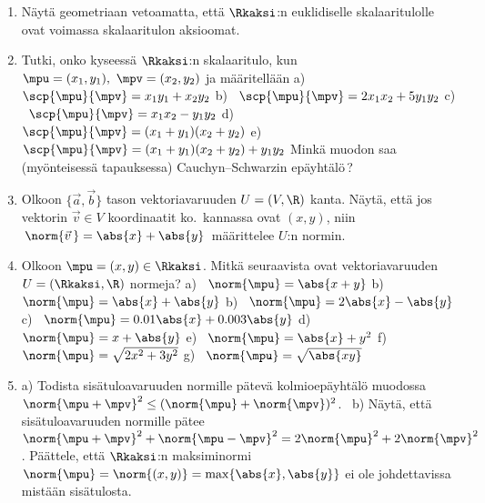 \Harj
\begin{enumerate}

\item
Näytä geometriaan vetoamatta, että $\Rkaksi$:n euklidiselle skalaaritulolle ovat voimassa
skalaaritulon aksioomat.

\item
Tutki, onko kyseessä $\Rkaksi$:n skalaaritulo, kun $\mpu=(x_1,y_1),\ \mpv = (x_2, y_2)$ ja
määritellään \newline
a) \ $\scp{\mpu}{\mpv}=x_1 y_1 + x_2 y_2$ \newline
b) \ $\scp{\mpu}{\mpv}=2x_1 x_2 + 5y_1 y_2$ \newline
c) \ $\scp{\mpu}{\mpv}=x_1 x_2 - y_1 y_2$ \newline
d) \ $\scp{\mpu}{\mpv}=(x_1+y_1)(x_2+y_2)$ \newline
e) \ $\scp{\mpu}{\mpv}=(x_1+y_1)(x_2+y_2)+y_1 y_2$ \newline
Minkä muodon saa (myönteisessä tapauksessa) Cauchyn--Schwarzin epäyhtälö\,?

\item
Olkoon $\{\vec a,\vec b\}$ tason vektoriavaruuden $U=(V,\R)$ kanta. Näytä, että jos vektorin
$\vec v \in V$ koordinaatit ko.\ kannassa ovat $(x,y)$, niin 
$\,\norm{\vec v\,} = \abs{x}+\abs{y}\,$ määrittelee $U$:n normin.

\item
Olkoon $\mpu=(x,y)\in\Rkaksi$. Mitkä seuraavista ovat vektoriavaruuden $U=(\Rkaksi,\R)$
normeja? \newline
a) \ $\norm{\mpu}=\abs{x+y}$ \newline
b) \ $\norm{\mpu}=\abs{x}+\abs{y}$ \newline
b) \ $\norm{\mpu}=2\abs{x}-\abs{y}$ \newline
c) \ $\norm{\mpu}=0.01\abs{x}+0.003\abs{y}$ \newline
d) \ $\norm{\mpu}=x+\abs{y}$ \newline
e) \ $\norm{\mpu}=\abs{x}+y^2$ \newline
f) \ $\norm{\mpu}=\sqrt{2x^2+3y^2}$ \newline
g) \ $\norm{\mpu}=\sqrt{\abs{xy}}$

\item \label{H-II-4: kolmioey} 
a) Todista sisätuloavaruuden normille pätevä kolmioepäyhtälö muodossa
$\norm{\mpu+\mpv}^2 \le (\norm{\mpu}+\norm{\mpv})^2$. \ b) Näytä, että sisätuloavaruuden
normille pätee  
$\norm{\mpu+\mpv}^2+\norm{\mpu-\mpv}^2=2\norm{\mpu}^2+2\norm{\mpv}^2$. Päättele, että
$\Rkaksi$:n maksiminormi $\norm{\mpu}=\norm{(x,y)}=\max\{\abs{x},\abs{y}\}$ ei ole johdettavissa
mistään sisätulosta.


\end{enumerate}
